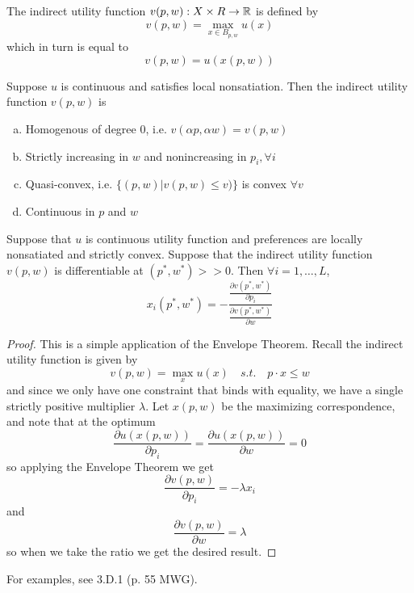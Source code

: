 \begin{definition}
  The indirect utility function $v(p,w): X \times R \to {\mathbb R}$ is defined by
  \[
  v(p,w) = \max_{x \in B_{p,w}} u(x)
  \]
  which in turn is equal to
  \[
  v(p,w) = u(x(p,w))
  \]
\end{definition}

\begin{prop}
  Suppose $u$ is continuous and satisfies local nonsatiation. Then the
  indirect utility function $v(p,w)$ is
  \begin{enumerate}[(a)]
  \item Homogenous of degree $0$, i.e. $v(\alpha p, \alpha w) = v(p,w)$
  \item Strictly increasing in $w$ and nonincreasing in $p_i, \forall i$
  \item Quasi-convex, i.e. $\{(p,w)|v(p,w) \leq v)\}$ is convex $\forall v$
  \item Continuous in $p$ and $w$
  \end{enumerate}
\end{prop}


\begin{prop}
  Suppose that $u$ is continuous utility function and preferences are
  locally nonsatiated and strictly convex. Suppose that the indirect
  utility function $v(p, w)$ is differentiable at $(p^*, w^*) >>
  0$. Then $\forall i = 1, \dots, L$,
  \[
  x_i(p^*, w^*)
  = - \frac{
    \frac{\partial v(p^*, w^*)}{\partial p_i}
  } {
    \frac{\partial v(p^*, w^*)}{\partial w}
  }
  \]
\end{prop}

\begin{proof}
  This is a simple application of the Envelope Theorem. Recall the
  indirect utility function is given by
  \[
  v(p,w) = \max_x u(x) \quad s.t. \quad p \cdot x \leq w
  \]
  and since we only have one constraint that binds with equality, we
  have a single strictly positive multiplier $\lambda$. Let $x(p,w)$
  be the maximizing correspondence, and note that at the optimum
  \[
  \frac{\partial u(x(p,w))}{\partial p_i}
  = \frac{\partial u(x(p,w))}{\partial w}
  = 0
  \]
  so applying the Envelope Theorem we get
  \[
  \frac{\partial v(p,w)}{\partial p_i} = -\lambda x_i
  \]
  and
  \[
  \frac{\partial v(p,w)}{\partial w} = \lambda 
  \]
  so when we take the ratio we get the desired result.
\end{proof}

For examples, see 3.D.1 (p. 55 MWG).
